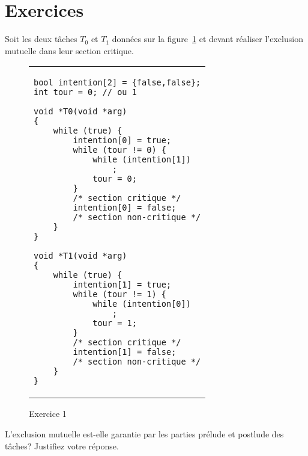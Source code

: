\section{Exercices}

\startexercice

Soit les deux tâches $T_0$ et $T_1$ données sur la figure~\ref{algex:Exercice1} et devant réaliser l'exclusion mutuelle dans leur section critique.
\begin{figure}[!ht]

\begin{center}
\begin{tabular}{l}
\lstset{language=C++}
\begin{lstlisting}
bool intention[2] = {false,false};
int tour = 0; // ou 1

void *T0(void *arg)
{
	while (true) {
		intention[0] = true;
		while (tour != 0) {
			while (intention[1])
				;
			tour = 0;
		}
		/* section critique */
		intention[0] = false;
		/* section non-critique */
	}
}

void *T1(void *arg)
{
	while (true) {
		intention[1] = true;
		while (tour != 1) {
			while (intention[0])
				;
			tour = 1;
		}
		/* section critique */
		intention[1] = false;
		/* section non-critique */
	}
}
\end{lstlisting}
\end{tabular}
\caption{\label{algex:Exercice1}Exercice 1}
\end{center}
\end{figure}
L'exclusion mutuelle est-elle garantie par les parties prélude et postlude des tâches? Justifiez votre réponse.
